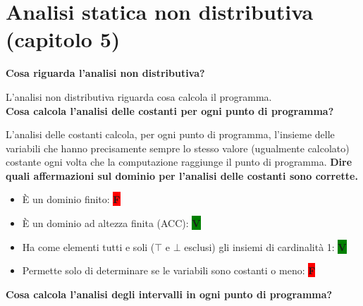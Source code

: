\documentclass[a4paper,oneside,titlepage]{book}
\begin{document}
\section{Analisi statica non distributiva (capitolo 5)}
\textbf{Cosa riguarda l'analisi non distributiva?}

L'analisi non distributiva riguarda cosa calcola il programma.
\bigskip
\\
\textbf{Cosa calcola l'analisi delle costanti per ogni punto di programma?}

L'analisi delle costanti calcola, per ogni punto di programma, l'insieme delle variabili che hanno precisamente sempre lo stesso valore (ugualmente calcolato) costante ogni volta che la computazione raggiunge il punto di programma.
\newpage
\noindent
\textbf{Dire quali affermazioni sul dominio per l'analisi delle costanti sono corrette.}
\begin{itemize}
    \item \`{E} un dominio finito: \colorbox{red}{\textbf{F}}
    \item \`{E} un dominio ad altezza finita (ACC): \colorbox{green}{\textbf{V}}
    \item Ha come elementi tutti e soli ($\top$ e $\bot$ esclusi) gli insiemi di cardinalità 1: \colorbox{green}{\textbf{V}}
    \item Permette solo di determinare se le variabili sono costanti o meno: \colorbox{red}{\textbf{F}}
\end{itemize}
\noindent
\textbf{Cosa calcola l'analisi degli intervalli in ogni punto di programma?}
\end{document}
